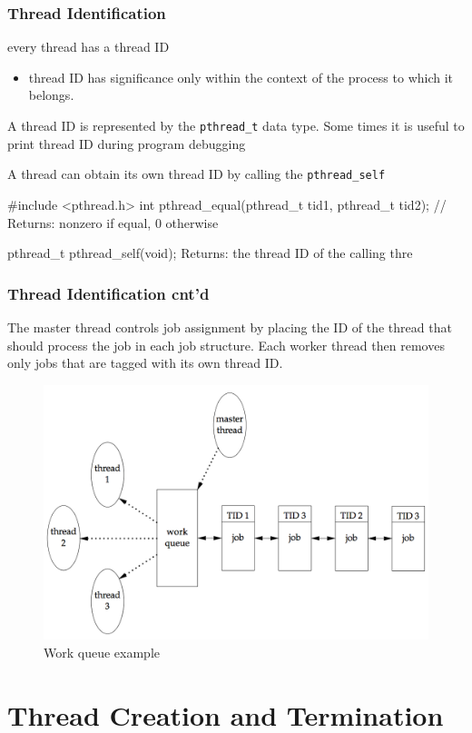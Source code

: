 \documentclass[newPxFont,sthlmFooter,nooffset]{beamer}
\begin{document}
\begin{frame}[fragile,t]
  \frametitle{Thread Identification}
  every thread has a thread ID
  \begin{itemize}
  \item thread ID has significance only within the context of the process to which it belongs.
  \end{itemize}

\bigskip
A thread ID is represented by the \texttt{pthread\_t} data type. Some times it is useful to print thread ID during program debugging

A thread can obtain its own thread ID by calling the \texttt{pthread\_self}
\begin{codedef}
#include <pthread.h>
int pthread_equal(pthread_t tid1, pthread_t tid2);
// Returns: nonzero if equal, 0 otherwise

pthread_t pthread_self(void);
Returns: the thread ID of the calling thre
\end{codedef}


\end{frame}


\begin{frame}[t]
  \frametitle{Thread Identification cnt'd}
  The master thread controls job assignment by placing the ID of the thread that should process the job in each job structure. Each worker thread then removes only jobs that are tagged with its own thread ID.

  \begin{figure}[h]
    \centering
    \includegraphics[width=0.7\linewidth]{figure/fig11-1}
    \caption{Work queue example}
    \label{fig:work}
  \end{figure}
\end{frame}


\section{Thread Creation and Termination}
\end{document}
